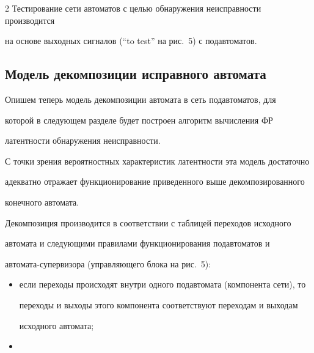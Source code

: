 \begin{multicols}{2}
Тестирование сети автоматов с целью обнаружения неисправности производится


на основе выходных сигналов (``to test'' на рис.~5) с подавтоматов.








\vspace*{6pt}


\subsection{Модель декомпозиции исправного автомата}





\vspace*{2pt}







Опишем теперь модель декомпозиции автомата в сеть подавтоматов, для


которой в следующем разделе будет построен алгоритм вычисления ФР


латентности обнаружения неисправности.


С точки зрения вероятностных характеристик латентности эта модель достаточно


адекватно отражает функционирование приведенного выше декомпозированного


конечного автомата.





Декомпозиция производится в соответствии с таблицей переходов исходного


автомата и сле\-ду\-ющи\-ми правилами функционирования подавтоматов и


автомата-супервизора (управляющего блока на рис.~5):\\[-9pt]


\begin{itemize}


\item


если переходы происходят внутри одного под\-ав\-то\-ма\-та (компонента сети), то


переходы и выходы этого компонента соответствуют переходам и выходам


исходного автомата;\\[-9pt]


\item



\end{itemize}
\end{multicols}
